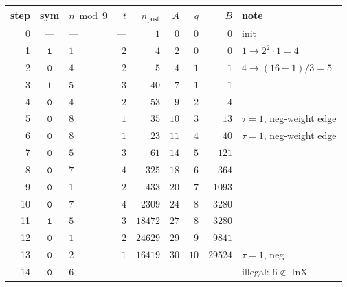 \documentclass[11pt,a4paper]{article}
\theoremstyle{plain}
\theoremstyle{definition}
\DeclareMathOperator{\InX}{InX}
\begin{document}
\begin{center}\footnotesize
\begin{tabular}{rclrrrrrl}
\toprule
step & sym & $n \bmod 9$ & $t$ & $n_{\text{post}}$ & $A$ & $q$ & $B$ & note \\
\midrule
0    & ---           & ---  & --- & $1$            & $0$  & $0$  & $0$              & init \\
1    & $\mathtt{1}$  & $1$  & $2$ & $4$            & $2$  & $0$  & $0$              & $1 \to 2^2 \cdot 1 = 4$ \\
2    & $\mathtt{0}$  & $4$  & $2$ & $5$            & $4$  & $1$  & $1$              & $4 \to (16-1)/3 = 5$ \\
3    & $\mathtt{1}$  & $5$  & $3$ & $40$           & $7$  & $1$  & $1$              & \\
4    & $\mathtt{0}$  & $4$  & $2$ & $53$           & $9$  & $2$  & $4$              & \\
5    & $\mathtt{0}$  & $8$  & $1$ & $35$           & $10$ & $3$  & $13$             & $\tau=1$, neg-weight edge \\
6    & $\mathtt{0}$  & $8$  & $1$ & $23$           & $11$ & $4$  & $40$             & $\tau=1$, neg-weight edge \\
7    & $\mathtt{0}$  & $5$  & $3$ & $61$           & $14$ & $5$  & $121$            & \\
8    & $\mathtt{0}$  & $7$  & $4$ & $325$          & $18$ & $6$  & $364$            & \\
9    & $\mathtt{0}$  & $1$  & $2$ & $433$          & $20$ & $7$  & $1093$           & \\
10   & $\mathtt{0}$  & $7$  & $4$ & $2309$         & $24$ & $8$  & $3280$           & \\
11   & $\mathtt{1}$  & $5$  & $3$ & $18472$        & $27$ & $8$  & $3280$           & \\
12   & $\mathtt{0}$  & $1$  & $2$ & $24629$        & $29$ & $9$  & $9841$           & \\
13   & $\mathtt{0}$  & $2$  & $1$ & $16419$        & $30$ & $10$ & $29524$          & $\tau=1$, neg \\
14   & $\mathtt{0}$  & $6$  & --- & ---            & ---  & ---  & ---              & illegal: $6 \notin \InX$ \\
\bottomrule
\end{tabular}
\end{center}
\end{document}
